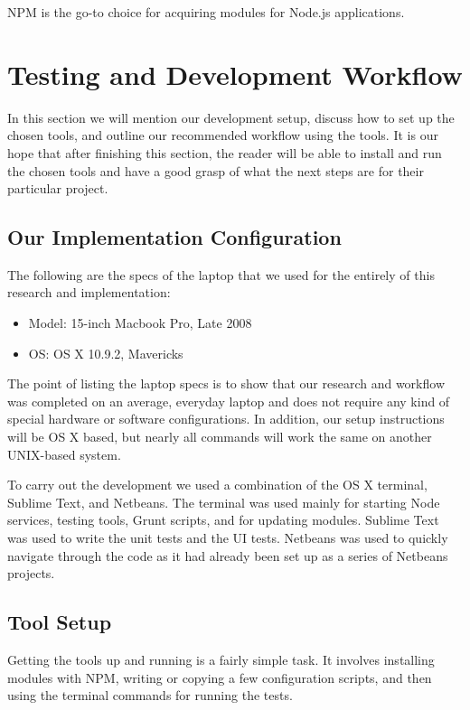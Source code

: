 \documentclass[12pt]{ucthesis}
\begin{document}
NPM is the go-to choice for acquiring modules for Node.js applications.

\chapter{Testing and Development Workflow}
In this section we will mention our development setup, discuss how to set up the chosen tools, and outline our recommended workflow using the tools. It is our hope that after finishing this section, the reader will be able to install and run the chosen tools and have a good grasp of what the next steps are for their particular project.

\section{Our Implementation Configuration}
The following are the specs of the laptop that we used for the entirely of this research and implementation:
\begin{itemize}
  \item Model: 15-inch Macbook Pro, Late 2008
  \item OS: OS X 10.9.2, Mavericks
\end{itemize}
The point of listing the laptop specs is to show that our research and workflow was completed on an average, everyday laptop and does not require any kind of special hardware or software configurations. In addition, our setup instructions will be OS X based, but nearly all commands will work the same on another UNIX-based system.

To carry out the development we used a combination of the OS X terminal, Sublime Text, and Netbeans. The terminal was used mainly for starting Node services, testing tools, Grunt scripts, and for updating modules. Sublime Text was used to write the unit tests and the UI tests. Netbeans was used to quickly navigate through the code as it had already been set up as a series of Netbeans projects.

\section{Tool Setup}
Getting the tools up and running is a fairly simple task. It involves installing modules with NPM, writing or copying a few configuration scripts, and then using the terminal commands for running the tests.
\end{document}
